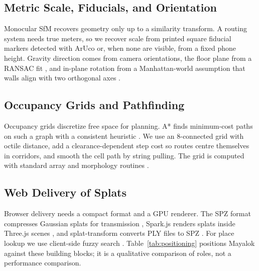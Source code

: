 \documentclass[conference]{IEEEtran}
\begin{document}
\subsection{Metric Scale, Fiducials, and Orientation}
Monocular SfM recovers geometry only up to a similarity transform. A routing system needs true meters, so we recover scale from printed square fiducial markers detected with ArUco \cite{garridojurado2014aruco} or, when none are visible, from a fixed phone height. Gravity direction comes from camera orientations, the floor plane from a RANSAC fit \cite{fischler1981ransac}, and in-plane rotation from a Manhattan-world assumption that walls align with two orthogonal axes \cite{coughlan1999manhattan}.

\subsection{Occupancy Grids and Pathfinding}
Occupancy grids discretize free space for planning. A* finds minimum-cost paths on such a graph with a consistent heuristic \cite{hart1968astar}. We use an 8-connected grid with octile distance, add a clearance-dependent step cost so routes centre themselves in corridors, and smooth the cell path by string pulling. The grid is computed with standard array and morphology routines \cite{virtanen2020scipy,bradski2000opencv}.

\subsection{Web Delivery of Splats}
Browser delivery needs a compact format and a GPU renderer. The SPZ format compresses Gaussian splats for transmission \cite{spz2025}, Spark.js renders splats inside Three.js scenes \cite{spark2025,threejs}, and splat-transform converts PLY files to SPZ \cite{splattransform}. For place lookup we use client-side fuzzy search \cite{fusejs}. Table~\ref{tab:positioning} positions Mayalok against these building blocks; it is a qualitative comparison of roles, not a performance comparison.
\end{document}
